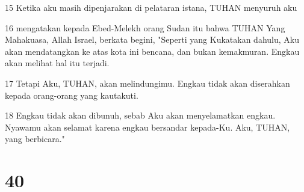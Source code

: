 \par 15 Ketika aku masih dipenjarakan di pelataran istana, TUHAN menyuruh aku
\par 16 mengatakan kepada Ebed-Melekh orang Sudan itu bahwa TUHAN Yang Mahakuasa, Allah Israel, berkata begini, "Seperti yang Kukatakan dahulu, Aku akan mendatangkan ke atas kota ini bencana, dan bukan kemakmuran. Engkau akan melihat hal itu terjadi.
\par 17 Tetapi Aku, TUHAN, akan melindungimu. Engkau tidak akan diserahkan kepada orang-orang yang kautakuti.
\par 18 Engkau tidak akan dibunuh, sebab Aku akan menyelamatkan engkau. Nyawamu akan selamat karena engkau bersandar kepada-Ku. Aku, TUHAN, yang berbicara."

\chapter{40}

